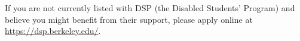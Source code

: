 \documentclass[11pt]{article}
\begin{document}
If you are not currently listed with DSP (the Disabled Students’ Program) and believe you might benefit from their support, please apply online at \url{https://dsp.berkeley.edu/}.




%
%
%
%
%
\end{document}
